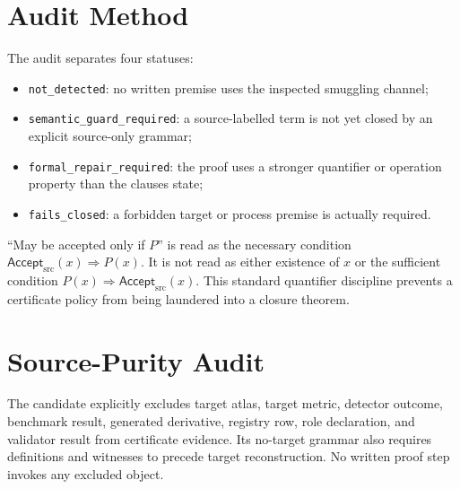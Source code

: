 \documentclass[11pt]{article}
\newcommand{\Accept}{\mathsf{Accept}_{\mathrm{src}}}
\begin{document}
\section{Audit Method}

The audit separates four statuses:
\begin{itemize}[leftmargin=*]
  \item \texttt{not\_detected}: no written premise uses the inspected
  smuggling channel;
  \item \texttt{semantic\_guard\_required}: a source-labelled term is not yet
  closed by an explicit source-only grammar;
  \item \texttt{formal\_repair\_required}: the proof uses a stronger
  quantifier or operation property than the clauses state;
  \item \texttt{fails\_closed}: a forbidden target or process premise is
  actually required.
\end{itemize}

``May be accepted only if \(P\)'' is read as the necessary condition
\(\Accept(x)\Rightarrow P(x)\). It is not read as either existence of \(x\) or
the sufficient condition \(P(x)\Rightarrow\Accept(x)\). This standard
quantifier discipline prevents a certificate policy from being laundered into
a closure theorem.

\section{Source-Purity Audit}

The candidate explicitly excludes target atlas, target metric, detector
outcome, benchmark result, generated derivative, registry row, role
declaration, and validator result from certificate evidence. Its no-target
grammar also requires definitions and witnesses to precede target
reconstruction. No written proof step invokes any excluded object.
\end{document}
